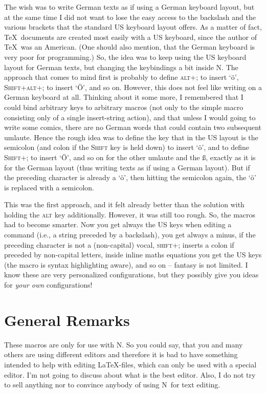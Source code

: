 \documentclass{article}
\newcommand{\nedit}{N\kern-0.8pt{Edit}}
\newcommand{\keyname}[1]{\textsc{#1}}
\begin{document}
The wish was to write German texts as if using a German keyboard layout, but at the same time I did not want to lose the easy access to the backslash and the various brackets that the standard US keyboard layout offers. As a matter of fact, \TeX\ documents are created most easily with a US keyboard, since the author of \TeX\ was an American. (One should also mention, that the German keyboard is very poor for programming.) So, the idea was to keep using the US keyboard layout for German texts, but changing the keybindings a bit inside \nedit. The approach that comes to mind first is probably to define \keyname{alt+;} to insert `\"o', \keyname{Shift+alt+;} to insert `\"O', and so on. However, this does not feel like writing on a German keyboard at all. Thinking about it some more, I remembered that I could bind arbitrary keys to arbitrary macros (not only to the simple macro consisting only of a single insert-string action), and that unless I would going to write some comics, there are no German words that could contain two subsequent umlaute. Hence the rough idea was to define the key that in the US layout is the semicolon (and colon if the \keyname{Shift} key is held down) to insert `\"o', and to define \keyname{Shift+;} to insert `\"O', and so on for the other umlaute and the \ss, exactly as it is for the German layout (thus writing texts as if using a German layout). But if the preceding character is already a `\"o', then hitting the semicolon again, the `\"o' is replaced with a semicolon.

This was the first approach, and it felt already better than the solution with holding the \keyname{alt} key additionally. However, it was still too rough. So, the macros had to become smarter. Now you get always the US keys when editing a command (i.e., a string preceded by a backslash), you get always a minus, if the preceding character is not a (non-capital) vocal, \keyname{shift+;} inserts a colon if preceded by non-capital letters, inside inline maths equations you get the US keys (the macro is syntax highlighting aware), and so on -- fantasy is not limited. I know these are very personalized configurations, but they possibly give you ideas for \emph{your own} configurations!



%
\newpage
\section{General Remarks}
These macros are only for use with \nedit. So you could say, that you and many others are using different editors and therefore it is bad to have something intended to help with editing \LaTeX-files, which can only be used with a special editor.
I'm not going to discuss about what is the best editor. Also, I do not try to sell anything nor to convince anybody of using \nedit\ for text editing.
\end{document}
